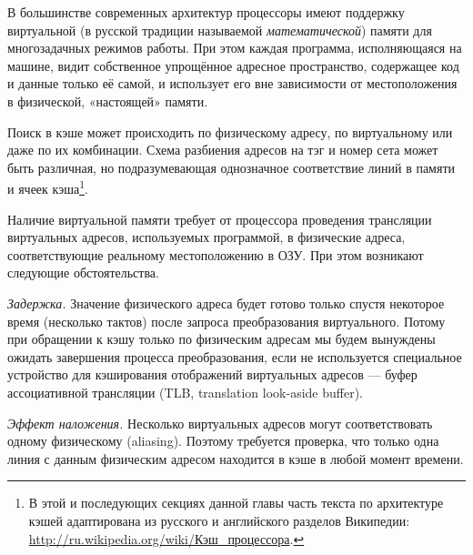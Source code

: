 В большинстве современных архитектур процессоры имеют поддержку виртуальной (в русской традиции называемой \textit{математической}) памяти для многозадачных режимов работы. При этом каждая программа, исполняющаяся на машине, видит собственное упрощённое адресное пространство, содержащее код и данные только её самой, и использует его вне зависимости от местоположения в физической, «настоящей» памяти. 

Поиск в кэше может происходить по физическому адресу, по виртуальному или даже по их комбинации. Схема разбиения адресов на тэг и номер сета может быть различная, но подразумевающая однозначное соответствие линий в памяти и ячеек кэша\footnote{В этой и последующих секциях данной главы часть текста по архитектуре кэшей адаптирована из русского и английского разделов Википедии: \url{http://ru.wikipedia.org/wiki/Кэш_процессора}.}.

Наличие виртуальной памяти требует от процессора проведения трансляции виртуальных  адресов, используемых программой, в физические адреса, соответствующие реальному местоположению в ОЗУ. При этом возникают следующие обстоятельства.

\begin{itemize*}
\item    \textit{Задержка.} Значение физического адреса будет готово только спустя некоторое время (несколько тактов) после запроса преобразования виртуального. Потому при обращении к кэшу только по физическим адресам мы будем вынуждены ожидать завершения процесса преобразования, если не используется специальное устройство для кэширования отображений виртуальных адресов — буфер ассоциативной трансляции (\abbr TLB, translation look-aside buffer).

\item    \textit{Эффект наложения.} Несколько виртуальных адресов могут соответствовать одному физическому (\abbr aliasing). Поэтому требуется проверка, что только одна линия с данным физическим адресом находится в кэше в любой момент времени.
\end{itemize*}


